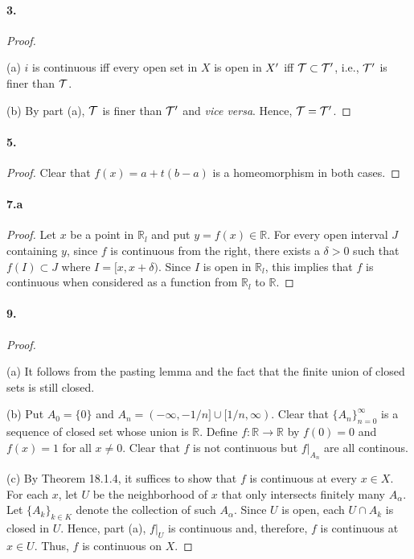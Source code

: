   \paragraph{3.}
  \begin{proof}
    $\,$\par
    (a) $i$ is continuous iff every open set in $X$ is open in $X^\prime$ iff 
    $\mathcal{T}\subset\mathcal{T}^\prime$, i.e., $\mathcal{T}^\prime$ is finer than $\mathcal{T}$.
    \par
    (b) By part (a), $\mathcal{T}$ is finer than $\mathcal{T}^\prime$ and \textit{vice 
    versa}. Hence, $\mathcal{T}=\mathcal{T}^\prime$.
  \end{proof}
  
  \paragraph{5.}
  \begin{proof}
    Clear that $f(x)=a+t(b-a)$ is a homeomorphism in both cases.
  \end{proof}
  
  \paragraph{7.a}
  \begin{proof}
    Let $x$ be a point in $\mathbb{R}_l$ and put $y=f(x)\in\mathbb{R}$. For
    every open interval $J$ containing $y$, since $f$ is continuous from the
    right, there exists a $\delta>0$ such that $f(I)\subset J$ where $I=[x, x+
    \delta)$. Since $I$ is open in $\mathbb{R}_l$, this implies that $f$ is
    continuous when considered as a function from $\mathbb{R}_l$ to 
    $\mathbb{R}$.
  \end{proof}
  
  \paragraph{9.}
  \begin{proof}
    $\,$\par
    (a) It follows from the pasting lemma and the fact that the finite union of 
    closed sets is still closed.\par
    (b) Put $A_0=\{0\}$ and $A_n=(-\infty,-1/n]\cup[1/n,\infty)$. Clear that 
    $\{A_n\}_{n=0}^\infty$ is a sequence of closed set whose union is 
    $\mathbb{R}$. Define $f:\mathbb{R}\to\mathbb{R}$ by $f(0)=0$ and $f(x)=1$
    for all $x\ne 0$. Clear that $f$ is not continuous but $f|_{A_n}$ are all
    continous.\par
    (c) By Theorem 18.1.4, it suffices to show that $f$ is continuous at every
    $x\in X$. For each $x$, let $U$ be the neighborhood of $x$ that only 
    intersects finitely many $A_\alpha$. Let $\{A_k\}_{k\in K}$ denote the 
    collection of such $A_\alpha$. Since $U$ is open, each $U\cap A_k$ is 
    closed in $U$. Hence, part (a), $f|_U$ is continuous and, therefore, $f$ is
    continuous at $x\in U$. Thus, $f$ is continuous on $X$.
  \end{proof}
  
